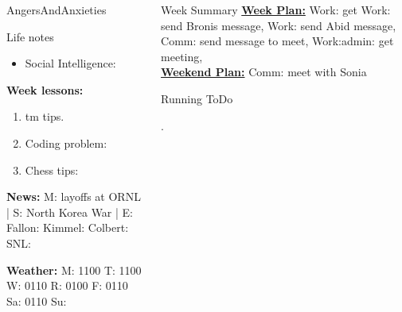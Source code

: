 \begin{columns}
\begin{column}{0.20\linewidth}
\begin{block}{AngersAndAnxieties}
\begin{itemize}
      \end{itemize}
    \end{block}
      \begin{block}{Life notes}
        \begin{itemize}
          \tiny \item \tiny Social Intelligence: 
        \end{itemize}
      \end{block}
      \begin{block}
        {\tiny {\bf Week lessons:}}
        \begin{enumerate}
        \item \tiny tm tips.
        \item \tiny Coding problem: 
        \item \tiny Chess tips: 
        \end{enumerate}
            {{\tiny {\tiny \bf  News:}} {\tiny  M: layoffs at ORNL | S: North Korea War
                | E: Fallon:  Kimmel:  Colbert: SNL:}}

            {{\tiny {\tiny \bf  Weather:}} {\tiny M: 1100 T: 1100 W:
                0110 R: 0100 F: 0110 Sa: 0110 Su: }}

             
      \end{block}
  \end{column}
  \begin{column}{0.6\linewidth}
    \begin{block}{Week Summary}
      {\underline {\bf Week Plan:} Work: get 
        Work: send Bronis message, Work: send Abid message, Comm: send
      message to meet, Work:admin: get meeting, } \\
      {\underline{\bf Weekend Plan:} Comm: meet with Sonia} \\
    \end{block}
      \begin{block}{Running ToDo} %
        \begin{enumerate}
         .  
      

\end{enumerate}
\end{block}
\end{column}
\end{columns}
